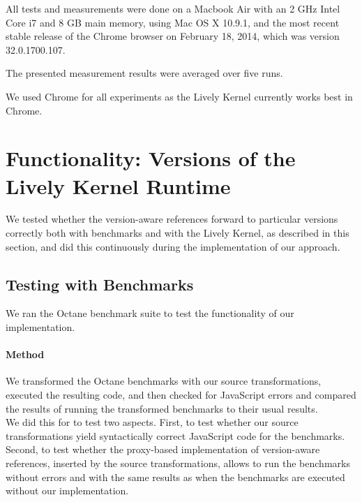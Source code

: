 All tests and measurements were done on a Macbook Air with an 2 GHz Intel Core i7 and 8 GB main memory, using Mac OS X 10.9.1, and the most recent stable release of the Chrome browser on February 18, 2014, which was version 32.0.1700.107.

The presented measurement results were averaged over five runs.

We used Chrome for all experiments as the Lively Kernel currently works best in Chrome.







\section{Functionality: Versions of the Lively Kernel Runtime} \label{sec:DISCUSSION:1}

We tested whether the version-aware references forward to particular versions correctly both with benchmarks and with the Lively Kernel, as described in this section, and did this continuously during the implementation of our approach.

\subsection{Testing with Benchmarks}

We ran the Octane benchmark suite to test the functionality of our implementation.

\paragraph{Method}
We transformed the Octane benchmarks with our source transformations, executed the resulting code, and then checked for JavaScript errors and compared the results of running the transformed benchmarks to their usual results.\\
We did this for to test two aspects.
First, to test whether our source transformations yield syntactically correct JavaScript code for the benchmarks.
Second, to test whether the proxy-based implementation of version-aware references, inserted by the source transformations, allows to run the benchmarks without errors and with the same results as when the benchmarks are executed without our implementation.


